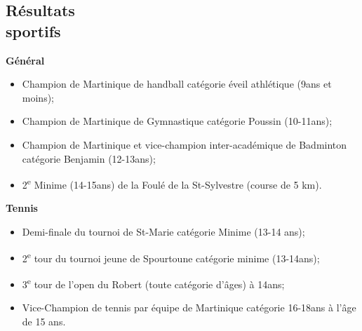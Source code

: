 \documentclass[margin]{res}
\begin{document}
\begin{resume}

  \section{R\'esultats \\sportifs}
  
  {\bf G\'en\'eral}
  \begin{itemize} \itemsep -2pt %
  \item Champion de Martinique de handball cat\'egorie \'eveil athl\'etique (9ans et moins);
  \item Champion de Martinique de Gymnastique cat\'egorie Poussin (10-11ans);
  \item Champion de Martinique et vice-champion inter-acad\'emique de Badminton cat\'egorie Benjamin (12-13ans);
  \item 2\textsuperscript{e} Minime (14-15ans) de la Foul\'e de la St-Sylvestre (course de 5 km).
  \end{itemize}

  {\bf Tennis}
  \begin{itemize} \itemsep -2pt %

  \item Demi-finale du tournoi de St-Marie cat\'egorie Minime (13-14 ans);
  \item 2\textsuperscript{e} tour du tournoi jeune de Spourtoune cat\'egorie minime (13-14ans);
  \item 3\textsuperscript{e} tour de l’open du Robert (toute cat\'egorie d'\^ages) à 14ans;
  \item Vice-Champion de tennis par \'equipe de Martinique cat\'egorie 16-18ans à l'\^age de 15 ans.
  \end{itemize}


\end{resume} 
\end{document}
